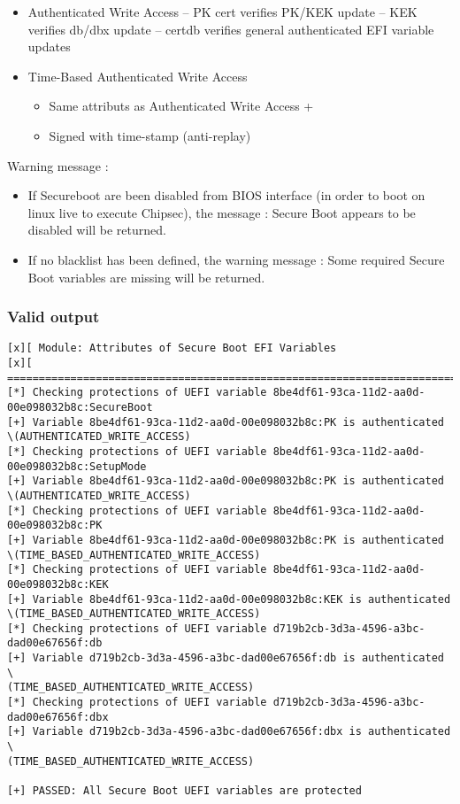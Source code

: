 \begin{itemize}
\tightlist
\item
  Authenticated Write Access -- PK cert verifies PK/KEK update -- KEK
  verifies db/dbx update -- certdb verifies general authenticated EFI
  variable updates
\item
  Time-Based Authenticated Write Access

  \begin{itemize}
  \tightlist
  \item
    Same attributs as Authenticated Write Access +
  \item
    Signed with time-stamp (anti-replay)
  \end{itemize}
\end{itemize}

Warning message :

\begin{itemize}
\tightlist
\item
  If Secureboot are been disabled from BIOS interface (in order to boot
  on linux live to execute Chipsec), the message : Secure Boot appears
  to be disabled will be returned.
\item
  If no blacklist has been defined, the warning message : Some required
  Secure Boot variables are missing will be returned.
\end{itemize}

\hypertarget{valid-output-20}{%
\subsubsection{Valid output}\label{valid-output-20}}

\begin{verbatim}
[x][ Module: Attributes of Secure Boot EFI Variables
[x][ =======================================================================
[*] Checking protections of UEFI variable 8be4df61-93ca-11d2-aa0d-00e098032b8c:SecureBoot
[+] Variable 8be4df61-93ca-11d2-aa0d-00e098032b8c:PK is authenticated 
\(AUTHENTICATED_WRITE_ACCESS)
[*] Checking protections of UEFI variable 8be4df61-93ca-11d2-aa0d-00e098032b8c:SetupMode
[+] Variable 8be4df61-93ca-11d2-aa0d-00e098032b8c:PK is authenticated 
\(AUTHENTICATED_WRITE_ACCESS)
[*] Checking protections of UEFI variable 8be4df61-93ca-11d2-aa0d-00e098032b8c:PK
[+] Variable 8be4df61-93ca-11d2-aa0d-00e098032b8c:PK is authenticated 
\(TIME_BASED_AUTHENTICATED_WRITE_ACCESS)
[*] Checking protections of UEFI variable 8be4df61-93ca-11d2-aa0d-00e098032b8c:KEK
[+] Variable 8be4df61-93ca-11d2-aa0d-00e098032b8c:KEK is authenticated 
\(TIME_BASED_AUTHENTICATED_WRITE_ACCESS)
[*] Checking protections of UEFI variable d719b2cb-3d3a-4596-a3bc-dad00e67656f:db
[+] Variable d719b2cb-3d3a-4596-a3bc-dad00e67656f:db is authenticated \
(TIME_BASED_AUTHENTICATED_WRITE_ACCESS)
[*] Checking protections of UEFI variable d719b2cb-3d3a-4596-a3bc-dad00e67656f:dbx
[+] Variable d719b2cb-3d3a-4596-a3bc-dad00e67656f:dbx is authenticated \
(TIME_BASED_AUTHENTICATED_WRITE_ACCESS)

[+] PASSED: All Secure Boot UEFI variables are protected
\end{verbatim}

